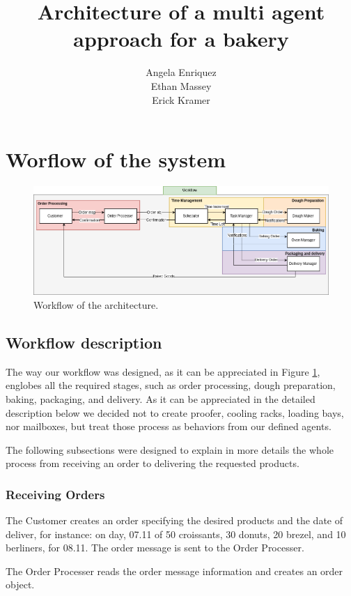 \documentclass[a4paper]{article}
\title{Architecture of a multi agent approach for a bakery}
\author{Angela Enriquez\\
	    Ethan Massey\\
	    Erick Kramer}
\begin{document}
	\maketitle
	\newpage
	\section{Worflow of the system}
	
	\begin{figure}[h!]
		\includegraphics[scale=0.4]{img/architecture-pipeline.png}
		\caption{Workflow of the architecture.}
		\label{fig: WF}
	\end{figure}
	
	\subsection{Workflow description}
	The way our workflow was designed, as it can be appreciated in Figure \ref{fig: WF}, englobes all the required stages, such as order processing, dough preparation, baking, packaging, and delivery. As it can be appreciated in the detailed description below we decided not to create proofer, cooling racks, loading bays, nor mailboxes, but treat those process as behaviors from our defined agents.
	
	The following subsections were designed to explain in more details the whole process from receiving an order to delivering the requested products.
	 
	\subsubsection{Receiving Orders}
	
	The Customer creates an order specifying the desired products and the date of deliver, for instance: on day, 07.11 of 50 croissants, 30 donuts, 20 brezel, and 10 berliners, for 08.11. The order message is sent to the Order Processer. 
	
	The Order Processer reads the order message information and creates an order object. 
	
\end{document}
